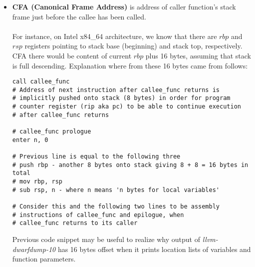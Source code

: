 \documentclass{report}
\begin{document}
\begin{itemize}
	
	\item \textbf{CFA (Canonical Frame Address)} is address of caller function's stack frame just before the callee has been called. \\ \\
	For instance, on Intel x84\_64 architecture, we know that there are $rbp$ and $rsp$ registers pointing to stack base (beginning) and stack top, respectively.
	CFA there would be content of current $rbp$ plus 16 bytes, assuming that stack is full descending. Explanation where from these 16 bytes came from follows:
	\begin{verbatim}
call callee_func
# Address of next instruction after callee_func returns is
# implicitly pushed onto stack (8 bytes) in order for program
# counter register (rip aka pc) to be able to continue execution
# after callee_func returns
	
# callee_func prologue
enter n, 0
	
# Previous line is equal to the following three
# push rbp - another 8 bytes onto stack giving 8 + 8 = 16 bytes in total
# mov rbp, rsp
# sub rsp, n - where n means 'n bytes for local variables'
	 		   
# Consider this and the following two lines to be assembly 
# instructions of callee_func and epilogue, when 
# callee_func returns to its caller
	\end{verbatim}
	Previous code snippet may be useful to realize why output of \textit{llvm-dwarfdump-10} has 16 bytes offset when it prints location lists of variables and function parameters. 
	
\end{itemize}
\end{document}
